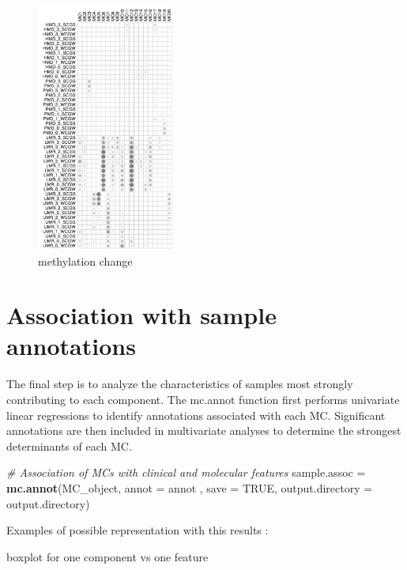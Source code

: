 \documentclass[]{article}
\newenvironment{Shaded}{\begin{snugshade}}{\end{snugshade}}
\newcommand{\CommentTok}[1]{\textcolor[rgb]{0.56,0.35,0.01}{\textit{#1}}}
\newcommand{\DataTypeTok}[1]{\textcolor[rgb]{0.13,0.29,0.53}{#1}}
\newcommand{\KeywordTok}[1]{\textcolor[rgb]{0.13,0.29,0.53}{\textbf{#1}}}
\newcommand{\NormalTok}[1]{#1}
\newcommand{\OtherTok}[1]{\textcolor[rgb]{0.56,0.35,0.01}{#1}}
\newcommand{\StringTok}[1]{\textcolor[rgb]{0.31,0.60,0.02}{#1}}
\begin{document}
\begin{figure}
\centering
\includegraphics[width=0.4\textwidth,height=0.4\textheight]{./CpG_context_Zhou.png}
\caption{methylation change}
\end{figure}

\hypertarget{association-with-sample-annotations}{%
\section{Association with sample
annotations}\label{association-with-sample-annotations}}

The final step is to analyze the characteristics of samples most
strongly contributing to each component. The mc.annot function first
performs univariate linear regressions to identify annotations
associated with each MC. Significant annotations are then included in
multivariate analyses to determine the strongest determinants of each
MC.

\begin{Shaded}
\begin{Highlighting}[]
\CommentTok{# Association of MCs with clinical and molecular features}
\NormalTok{sample.assoc =}\StringTok{ }\KeywordTok{mc.annot}\NormalTok{(MC_object, }\DataTypeTok{annot =}\NormalTok{ annot , }\DataTypeTok{save =} \OtherTok{TRUE}\NormalTok{, }\DataTypeTok{output.directory =}\NormalTok{ output.directory)}
\end{Highlighting}
\end{Shaded}

Examples of possible representation with this results :

boxplot for one component vs one feature
\end{document}
